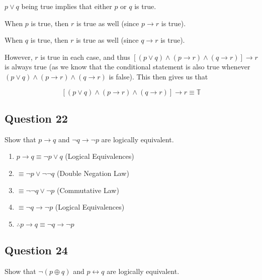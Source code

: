 \documentclass[12pt]{article}
\begin{document}
$p \lor q$ being true implies that either $p$ or $q$ is true.

When $p$ is true, then $r$ is true as well (since $p \to r$ is true).

When $q$ is true, then $r$ is true as well (since $q \to r$ is true).

However, $r$ is true in each case, and thus 
$[(p \lor q) \land (p \to r) \land (q \to r)] \to r$ is always true 
(as we know that the conditional statement is also true whenever 
$(p \lor q) \land (p \to r) \land (q \to r)$ is false). This then gives us that

\[
[(p \lor q) \land (p \to r) \land (q \to r)] \to r \equiv \mathbb{T}
\]

\subsection*{Question 22}

Show that $p \to q$ and $\neg q \to \neg p$ are logically equivalent.

\begin{enumerate}
  \item $p \to q \equiv \neg p \lor q$ (Logical Equivalences)
  \item $\equiv \neg p \lor \neg \neg q$ (Double Negation Law)
  \item $\equiv \neg \neg q \lor \neg p$ (Commutative Law)
  \item $\equiv \neg q \to \neg p$ (Logical Equivalences)
  \item $\therefore p \to q \equiv \neg q \to \neg p$
\end{enumerate}

\subsection*{Question 24}

Show that $\neg (p \oplus q)$ and $p \leftrightarrow q$ are logically equivalent.
\end{document}
